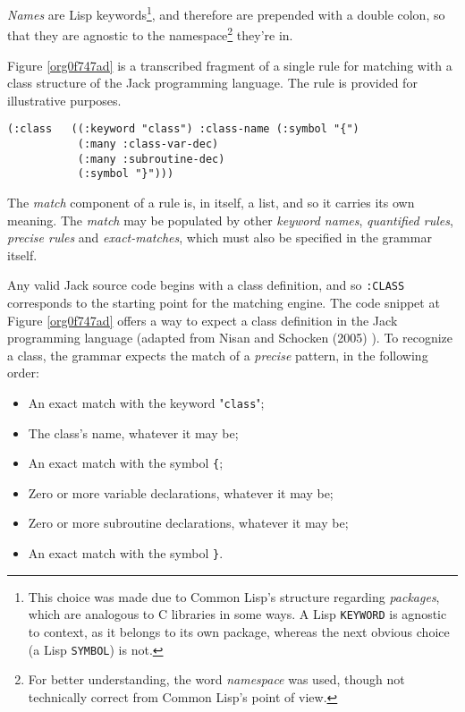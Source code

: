 \documentclass[a4paper,11pt,oneside]{article}
\begin{document}
\emph{Names} are Lisp keywords\footnote{This choice was made due to Common Lisp's structure regarding
\emph{packages}, which are analogous to C libraries in some ways. A Lisp
\texttt{KEYWORD} is agnostic to context, as it belongs to its own package,
whereas the next obvious choice (a Lisp \texttt{SYMBOL}) is not.}, and therefore are prepended with a
double colon, so that they are agnostic to the namespace\footnote{For better understanding, the word \emph{namespace} was used, though
not technically correct from Common Lisp's point of view.} they're
in.

Figure \ref{org0f747ad} is a transcribed fragment of a single rule
for matching with a class structure of the Jack programming
language. The rule is provided for illustrative purposes.

\begin{verbatim}
(:class   ((:keyword "class") :class-name (:symbol "{")
           (:many :class-var-dec)
           (:many :subroutine-dec)
           (:symbol "}")))
\end{verbatim}
\hfill \break

The \emph{match} component of a rule is, in itself, a list, and so it carries
its own meaning. The \emph{match} may be populated by other \emph{keyword names},
\emph{quantified rules}, \emph{precise rules} and \emph{exact-matches}, which must also be
specified in the grammar itself.

Any valid Jack source code begins with a class definition, and so
\texttt{:CLASS} corresponds to the starting point for the matching engine. The
code snippet at Figure \ref{org0f747ad} offers a way to expect a class
definition in the Jack programming language (adapted from Nisan and
Schocken (2005) \cite{nand2tetris}). To recognize a class, the grammar
expects the match of a \emph{precise} pattern, in the following order:

\begin{itemize}
\item An exact match with the keyword "\texttt{class}";
\item The class's name, whatever it may be;
\item An exact match with the symbol \texttt{\{};
\item Zero or more variable declarations, whatever it may be;
\item Zero or more subroutine declarations, whatever it may be;
\item An exact match with the symbol \texttt{\}}.
\end{itemize}
\end{document}
